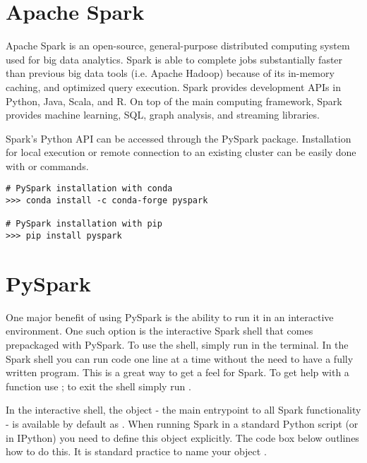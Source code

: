 
\section*{Apache Spark} %
Apache Spark is an open-source, general-purpose distributed computing system used for big data analytics. 
Spark is able to complete jobs substantially faster than previous big data tools (i.e. Apache Hadoop) because of its in-memory caching, and optimized query execution. 
Spark provides development APIs in Python, Java, Scala, and R. 
On top of the main computing framework, Spark provides machine learning, SQL, graph analysis, and streaming libraries.

Spark's Python API can be accessed through the PySpark package. Installation for local execution or remote connection to an existing cluster can be easily done with  or  commands.

\begin{lstlisting}
# PySpark installation with conda
>>> conda install -c conda-forge pyspark

# PySpark installation with pip
>>> pip install pyspark
\end{lstlisting}

\section*{PySpark} %
One major benefit of using PySpark is the ability to run it in an interactive environment. One such option is the interactive Spark shell that comes prepackaged with PySpark. To use the shell, simply run  in the terminal. In the Spark shell you can run code one line at a time without the need to have a fully written program. This is a great way to get a feel for Spark. To get help with a function use ; to exit the shell simply run .

In the interactive shell, the  object - the main entrypoint to all Spark functionality - is available by default as . When running Spark in a standard Python script (or in IPython) you need to define this object explicitly. The code box below outlines how to do this. It is standard practice to name your  object .

